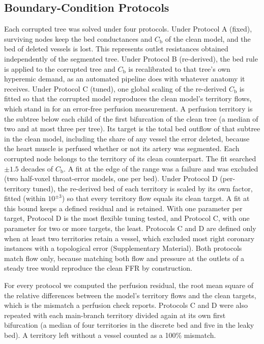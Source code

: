 \documentclass[journal,twoside,web]{ieeecolor}
\begin{document}
\subsection{Boundary-Condition Protocols}
Each corrupted tree was solved under four protocols. Under Protocol A (fixed), surviving
nodes keep the bed conductances and $C_\mathrm{b}$ of the clean model, and the bed of deleted vessels is lost. This represents
outlet resistances obtained independently of the segmented tree. Under Protocol B
(re-derived), the bed rule is applied to the corrupted tree and $C_\mathrm{b}$ is recalibrated to that tree's own hyperemic
demand, as an automated pipeline does with whatever anatomy it receives. Under Protocol C (tuned), one global
scaling of the re-derived $C_\mathrm{b}$ is fitted so that the corrupted model reproduces the clean model's territory
flows, which stand in for an error-free perfusion measurement. A perfusion territory is the subtree below each child of
the first bifurcation of the clean tree (a median of two and at most three per tree). Its target is the total bed outflow of that subtree in the clean model,
including the share of any vessel the error deleted, because the heart muscle is perfused whether or not its artery
was segmented. Each corrupted node belongs to the territory of its clean counterpart. The fit searched $\pm 1.5$ decades
of $C_\mathrm{b}$. A fit at the edge of the range was a failure and was excluded (two half-voxel throat-error models, one per bed).
Under Protocol D (per-territory tuned), the re-derived bed of each territory is scaled by its own factor, fitted (within $10^{\pm 3}$) so that every territory flow equals its clean target. A fit at this bound keeps a defined residual and is retained. With one parameter per target, Protocol D is the most flexible tuning tested, and Protocol C, with one parameter for two or more targets, the least. Protocols C and D are defined only when at least two territories retain a vessel, which excluded most right coronary
instances with a topological error (Supplementary Material). Both protocols match
flow only, because matching both flow and pressure at the outlets of a steady tree would reproduce the clean FFR by
construction.

For every protocol we computed the perfusion residual, the root mean square of the relative differences between the
model's territory flows and the clean targets, which is the mismatch a perfusion check reports. Protocols C and D were also repeated with each main-branch territory divided again at its own first bifurcation (a median of four territories in the discrete bed and five in the leaky bed). A territory left without a vessel counted as a 100\% mismatch.
\end{document}
